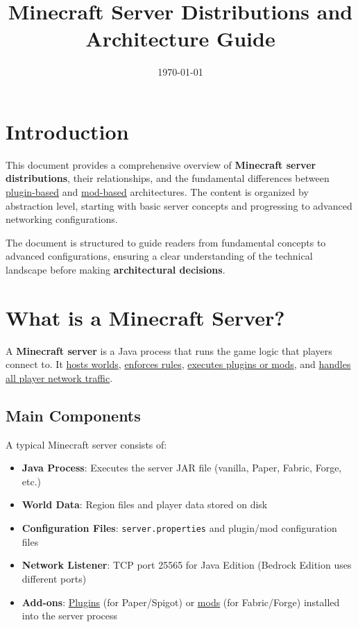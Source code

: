 \documentclass{article}
\title{Minecraft Server Distributions and Architecture Guide}
\author{}
\date{\today}
\begin{document}
\maketitle
\thispagestyle{plain}

\newpage
\tableofcontents
\thispagestyle{plain}

\newpage
\setcounter{page}{1}

\section{Introduction}

This document provides a comprehensive overview of \textbf{Minecraft server distributions}, their relationships, and the fundamental differences between \uline{plugin-based} and \uline{mod-based} architectures. The content is organized by abstraction level, starting with basic server concepts and progressing to advanced networking configurations.

The document is structured to guide readers from fundamental concepts to advanced configurations, ensuring a clear understanding of the technical landscape before making \textbf{architectural decisions}.

\section{What is a Minecraft Server?}

A \textbf{Minecraft server} is a Java process that runs the game logic that players connect to. It \uline{hosts worlds}, \uline{enforces rules}, \uline{executes plugins or mods}, and \uline{handles all player network traffic}.

\subsection{Main Components}

A typical Minecraft server consists of:

\begin{itemize}
    \item \textbf{Java Process}: Executes the server JAR file (vanilla, Paper, Fabric, Forge, etc.)
    \item \textbf{World Data}: Region files and player data stored on disk
    \item \textbf{Configuration Files}: \texttt{server.properties} and plugin/mod configuration files
    \item \textbf{Network Listener}: TCP port 25565 for Java Edition (Bedrock Edition uses different ports)
    \item \textbf{Add-ons}: \uline{Plugins} (for Paper/Spigot) or \uline{mods} (for Fabric/Forge) installed into the server process
\end{itemize}
\end{document}
